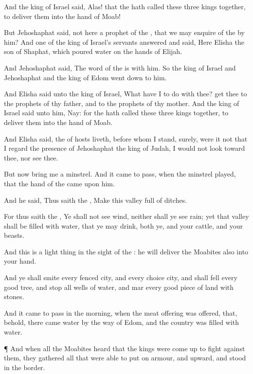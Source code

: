{And the
king of
Israel
said,
Alas! that the
{} hath
called these
three
kings
together, to
deliver them into the
hand of
Moab!

But
Jehoshaphat
said,
{} not here a
prophet of the
{}, that we may
enquire of the
{} by him? And
one of the
king of
Israel’s
servants
answered and
said, Here
{}
Elisha the
son of
Shaphat, which
poured
water on the
hands of
Elijah.

And
Jehoshaphat
said, The
word of the
{}
is with him. So the
king of
Israel and
Jehoshaphat and the
king of
Edom went
down to him.

And
Elisha
said unto the
king of
Israel, What have I to do with thee?
get thee to the
prophets of thy
father, and to the
prophets of thy
mother. And the
king of
Israel
said unto him, Nay: for the
{} hath
called these
three
kings
together, to
deliver them into the
hand of
Moab.

And
Elisha
said,
{} the
{} of
hosts
liveth,
before whom I
stand, surely, were it not
that I
regard the
presence of
Jehoshaphat the
king of
Judah, I would not
look toward thee, nor
see thee.

But now
bring me a
minstrel. And it came to pass, when the
minstrel
played, that the
hand of the
{} came upon him.

And he
said, Thus
saith the
{},
Make this
valley full of
ditches.

For thus
saith the
{}, Ye shall not
see
wind, neither shall ye
see
rain; yet that
valley shall be
filled with
water, that ye may
drink, both ye, and your
cattle, and your
beasts.

And this is
{} a light
thing in the
sight of the
{}: he will
deliver the
Moabites also into your
hand.

And ye shall
smite every
fenced
city, and every
choice
city, and shall
fell every
good
tree, and
stop all
wells of
water, and
mar every
good
piece of land with
stones.


\par }{\PP {}And it came to pass in the
morning, when the meat
offering was
offered, that, behold, there
came
water by the
way of
Edom, and the
country was
filled with
water.


\par }{\PP {}¶ And when all the
Moabites
heard that the
kings were come
up to
fight against them, they
gathered all that were able to
put on
armour, and
upward, and
stood in the
border.

}
